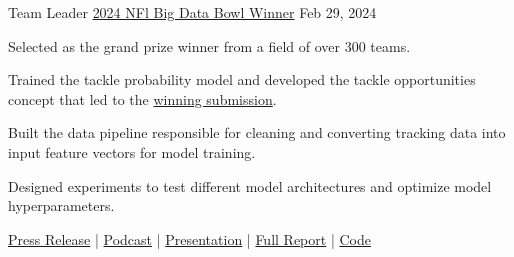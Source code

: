 

\begin{cventries}
    
\cventry
{Team Leader} %
{\href{https://operations.nfl.com/gameday/analytics/big-data-bowl/2024-big-data-bowl-winner-and-finalists/}{2024 NFl Big Data Bowl Winner}}
{} %
{Feb 29, 2024} %
{
  \begin{cvitems} %
    \item {Selected as the grand prize winner from a field of over 300 teams.}
    \item {Trained the tackle probability model and developed the tackle opportunities concept that led to the \href{https://www.kaggle.com/code/matthewpchang/uncovering-missed-tackle-opportunities}{winning submission}.}
    \item {Built the data pipeline responsible for cleaning and converting tracking data into input feature vectors for model training.}
    \item {Designed experiments to test different model architectures and optimize model hyperparameters.}
    \item {\href{https://operations.nfl.com/gameday/analytics/big-data-bowl/2024-big-data-bowl-winner-and-finalists/}{Press Release} | \href{https://www.trumedianetworks.com/expected-value-podcast/2024/3/12/matt-chang-nfl-big-data-bowl-winner}{Podcast} | \href{https://www.loom.com/share/54c67d584ee34efbb799e8dbbd551091}{Presentation} | \href{https://www.kaggle.com/code/matthewpchang/uncovering-missed-tackle-opportunities}{Full Report} | \href{https://github.com/mpchang/uncovering-missed-tackle-opportunities}{Code}}
  \end{cvitems}
}



\end{cventries}
